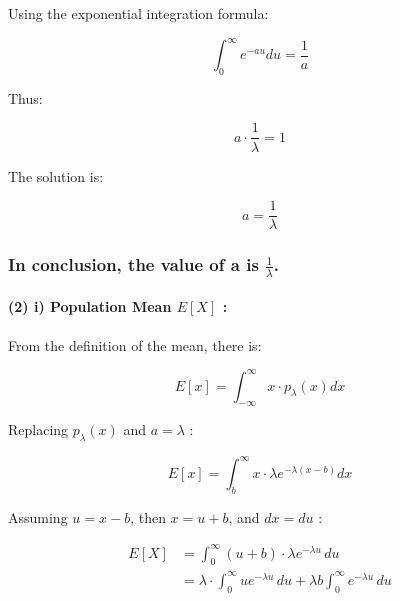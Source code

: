 \documentclass[
]{article}
\begin{document}
Using the exponential integration formula:

\[
\begin{equation*}
\int_{0}^{\infty} e^{-a u} d u=\frac{1}{a} \tag{7}
\end{equation*}
\]

Thus:

\[
\begin{equation*}
a \cdot \frac{1}{\lambda}=1 \tag{8}
\end{equation*}
\]

The solution is:

\[
\begin{equation*}
a=\frac{1}{\lambda} \tag{9}
\end{equation*}
\]

\subsubsection{\texorpdfstring{In conclusion, the value of a is
\(\frac{1}{\lambda}\).}{In conclusion, the value of a is \textbackslash frac\{1\}\{\textbackslash lambda\}.}}\label{in-conclusion-the-value-of-a-is-frac1lambda.}

\paragraph{\texorpdfstring{(2) i) Population Mean \(E[X]\)
:}{(2) i) Population Mean E{[}X{]} :}}\label{i-population-mean-ex}

From the definition of the mean, there is:

\[
\begin{equation*}
E[x]=\int_{-\infty}^{\infty} x \cdot p_{\lambda}(x) d x \tag{1}
\end{equation*}
\]

Replacing \(p_{\lambda}(x)\) and \(a=\lambda\) :

\[
\begin{equation*}
E[x]=\int_{b}^{\infty} x \cdot \lambda e^{-\lambda(x-b)} d x \tag{2}
\end{equation*}
\]

Assuming \(u=x-b\), then \(x=u+b\), and \(d x=d u\) :

\[
\begin{align*}
E[X] &= \int_{0}^{\infty}(u + b) \cdot \lambda e^{-\lambda u} \, du \\
     &= \lambda \cdot \int_{0}^{\infty} u e^{-\lambda u} \, du + \lambda b \int_{0}^{\infty} e^{-\lambda u} \, du \tag{3}
\end{align*}
\]
\end{document}
